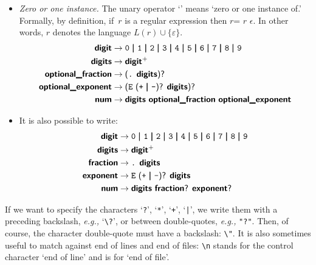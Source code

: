 \begin{itemize}

  \item \emph{Zero or one instance.} The unary operator `\opt{}' means
    `zero or one instance of.' Formally, by definition, if~\(r\) is a
    regular expression then \(r\)\opt = \(r\) \disj \(\epsilon\). In
    other words, \lparen\(r\)\rparen\opt{} denotes the language \(L(r)
    \cup \{\varepsilon\}\).
\begin{align*}
\term{digit} & \rightarrow \text{\exc{0} \disj \exc{1} \disj \exc{2}
  \disj \exc{3} \disj \exc{4} \disj \exc{5} \disj \exc{6} \disj
  \exc{7} \disj \exc{8} \disj \exc{9}}\\
\term{digits} & \rightarrow \text{\term{digit}\plus}\\
\term{optional\_fraction} & \rightarrow \text{\lparen\exc{.}
  \term{digits}\rparen\opt}\\
\term{optional\_exponent} & \rightarrow \text{\lparen\exc{E} \lparen
  \exc{+} \disj \exc{-}\rparen\opt{} \term{digits}\rparen\opt}\\
\term{num} & \rightarrow \text{\term{digits} \term{optional\_fraction}
  \term{optional\_exponent}}
\end{align*}

 \item It is also possible to write:
\begin{align*}
\term{digit} & \rightarrow \text{\exc{0} \disj \exc{1} \disj \exc{2}
  \disj \exc{3} \disj \exc{4} \disj \exc{5} \disj \exc{6} \disj
  \exc{7} \disj \exc{8} \disj \exc{9}}\\
\term{digits} & \rightarrow \text{\term{digit}\plus}\\
\term{fraction} & \rightarrow \text{\exc{.} \term{digits}}\\
\term{exponent} & \rightarrow \text{\exc{E} \lparen \exc{+} \disj
  \exc{-}\rparen\opt{} \term{digits}}\\
\term{num} & \rightarrow \text{\term{digits} \term{fraction}\opt{}
  \term{exponent}\opt}
\end{align*}

\end{itemize}
If we want to specify the characters `\texttt{?}', `\texttt{*}',
`\texttt{+}', `\texttt{|}', we write them with a preceding backslash,
\emph{e.g.,} `\verb+\?+', or between double-quotes, \emph{e.g.,}
\verb+"?"+. Then, of course, the character double-quote must have a
backslash: \verb+\"+. It is also sometimes useful to match against end
of lines and end of files: \verb+\n+ stands for the control character
`end of line' and \term{\$} is for `end of file'.

